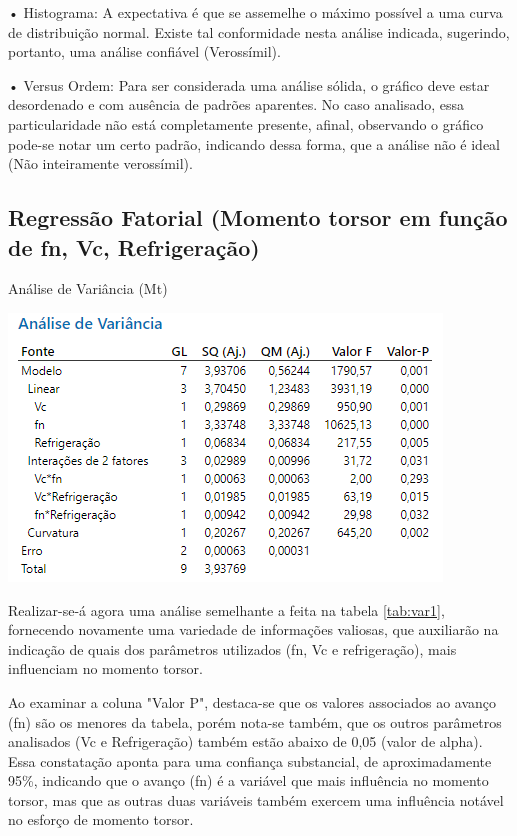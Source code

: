 \documentclass[deposito, acronym, symbols]{fei}
\begin{document}
•	Histograma: A expectativa é que se assemelhe o máximo possível a uma curva de distribuição normal. Existe tal conformidade nesta análise indicada, sugerindo, portanto, uma análise confiável (Verossímil).

•	Versus Ordem: Para ser considerada uma análise sólida, o gráfico deve estar desordenado e com ausência de padrões aparentes. No caso analisado, essa particularidade não está completamente presente, afinal, observando o gráfico pode-se notar um certo padrão, indicando dessa forma, que a análise não é ideal (Não inteiramente verossímil).

\subsection{Regressão Fatorial (Momento torsor em função de fn, Vc, Refrigeração)} \label{regressão mt}

\begin{table}[!htb]
 \centering
    \caption{Análise de Variância (Mt)}
    \includegraphics[width=0.8\linewidth]{Imagens/variancia 2.png}
    \label{tab:var2}
 \end{table}

Realizar-se-á agora uma análise semelhante a feita na tabela \ref{tab:var1}, fornecendo novamente uma variedade de informações valiosas, que auxiliarão na indicação de quais dos parâmetros utilizados (fn, Vc e refrigeração), mais influenciam no momento torsor.

Ao examinar a coluna "Valor P", destaca-se que os valores associados ao avanço (fn) são os menores da tabela, porém nota-se também, que os outros parâmetros analisados (Vc e Refrigeração) também estão abaixo de 0,05 (valor de alpha). Essa constatação aponta para uma confiança substancial, de aproximadamente 95\%, indicando que o avanço (fn) é a variável que mais influência no momento torsor, mas que as outras duas variáveis também exercem uma influência notável no esforço de momento torsor.
\end{document}
